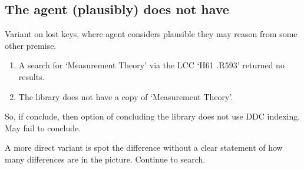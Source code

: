 \subsection{The agent (plausibly) does not have \zS{}}
\label{cha:zS:sec:question:illu:basic:does-not-have}

\begin{note}
  Variant on lost keys, where agent considers plausible they may reason from some other premise.
  {
    \color{red}
    \begin{illustration}
      \begin{enumerate}
      \item
        A search for `Measurement Theory' via the LCC `H61 .R593' returned no results.
      \item
        The library does not have a copy of `Measurement Theory'.
      \end{enumerate}
    \end{illustration}

    So, if conclude, then option of concluding the library does not use DDC indexing.
    May fail to conclude.
  }

  A more direct variant is spot the difference without a clear statement of how many differences are in the picture.
  Continue to search.
\end{note}

